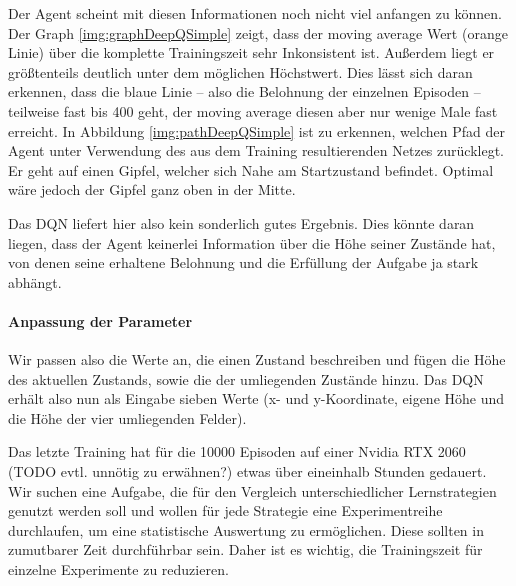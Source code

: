 Der Agent scheint mit diesen Informationen noch nicht viel anfangen zu können. Der Graph \ref{img:graphDeepQSimple} zeigt, dass der moving average Wert (orange Linie) über die komplette Trainingszeit sehr Inkonsistent ist. Außerdem liegt er größtenteils deutlich unter dem möglichen Höchstwert. Dies lässt sich daran erkennen, dass die blaue Linie -- also die Belohnung der einzelnen Episoden -- teilweise fast bis 400 geht, der moving average diesen aber nur wenige Male fast erreicht. In Abbildung \ref{img:pathDeepQSimple} ist zu erkennen, welchen Pfad der Agent unter Verwendung des aus dem Training resultierenden Netzes zurücklegt. Er geht auf einen Gipfel, welcher sich Nahe am Startzustand befindet. Optimal wäre jedoch der Gipfel ganz oben in der Mitte.

Das DQN liefert hier also kein sonderlich gutes Ergebnis. Dies könnte daran liegen, dass der Agent keinerlei Information über die Höhe seiner Zustände hat, von denen seine erhaltene Belohnung und die Erfüllung der Aufgabe ja stark abhängt.

\paragraph{Anpassung der Parameter}
Wir passen also die Werte an, die einen Zustand beschreiben und fügen die Höhe des aktuellen Zustands, sowie die der umliegenden Zustände hinzu. Das DQN erhält also nun als Eingabe sieben Werte (x- und y-Koordinate, eigene Höhe und die Höhe der vier umliegenden Felder).

Das letzte Training hat für die 10000 Episoden auf einer Nvidia RTX 2060 (TODO evtl. unnötig zu erwähnen?) etwas über eineinhalb Stunden gedauert. Wir suchen eine Aufgabe, die für den Vergleich unterschiedlicher Lernstrategien genutzt werden soll und wollen für jede Strategie eine Experimentreihe durchlaufen, um eine statistische Auswertung zu ermöglichen. Diese sollten in zumutbarer Zeit durchführbar sein. Daher ist es wichtig, die Trainingszeit für einzelne Experimente zu reduzieren. 

